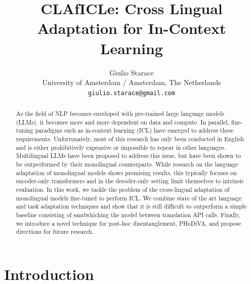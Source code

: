 \documentclass[11pt]{article}
\title{CLAfICLe: Cross Lingual Adaptation for In-Context Learning}
\author{Giulio Starace \\
  University of Amsterdam / Amsterdam, The Netherlands \\
  \texttt{giulio.starace@gmail.com} \\}
\begin{document}
\maketitle
\begin{abstract}

	As the field of NLP becomes enveloped with pre-trained large language models (LLMs), it becomes
	more and more dependent on data and compute. In parallel, fine-tuning paradigms such as in-context
	learning (ICL) have emerged to address these requirements. Unfortunately, most of this research
	has only been conducted in English and is either prohibitively expensive or impossible to repeat
	in other languages. Multilingual LLMs have been proposed to address this issue, but have been
	shown to be outperformed by their monolingual counterparts. While research on the language
	adaptation of monolingual models shows promising results, this typically focuses on encoder-only
	transformers and in the decoder-only setting limit themselves to intrinsic evaluation. In this
	work, we tackle the problem of the cross-lingual adaptation of monolingual models fine-tuned to
	perform ICL. We combine state of the art language and task adaptation techniques and show that it
	is still difficult to outperform a simple baseline consisting of sandwhiching the model between
	translation API calls. Finally, we introduce a novel technique for post-hoc disentanglement,
	PHoDiVA, and propose directions for future research.

\end{abstract}
\section{Introduction}
\end{document}
